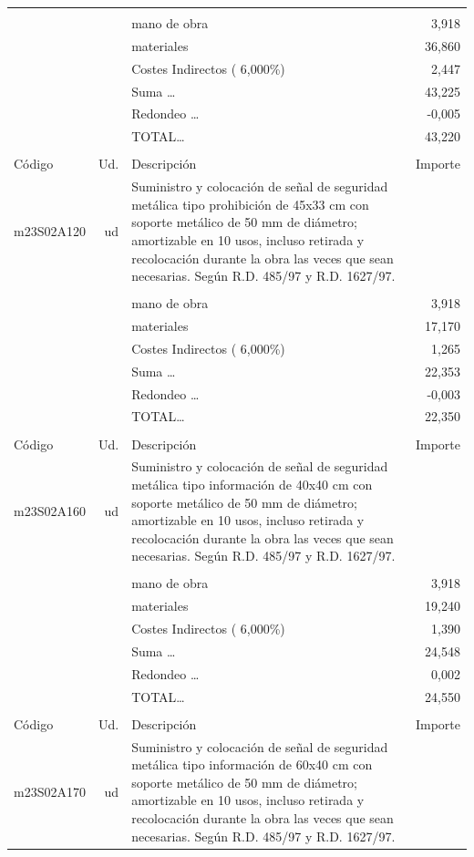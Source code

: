 \begin{supertabular}{l r p{60mm} r}
&&&\\%
&&mano de obra&     3,918\\%
&&materiales&    36,860\\%
&&Costes Indirectos (     6,000\%)&     2,447\\%
&&Suma \ldots&    43,225\\%
&&Redondeo \ldots&    {-}0,005\\%
%
&&TOTAL\ldots&    43,220\\%
&&&\\%
Código&Ud.&Descripción&Importe\\%
\hline%
m23S02A120&ud&Suministro y colocación de señal de seguridad metálica tipo prohibición de 45x33 cm con soporte metálico de 50 mm de diámetro; amortizable en 10 usos, incluso retirada y recolocación durante la obra las veces que sean necesarias. Según R.D. 485/97 y R.D. 1627/97.&\\%
&&&\\%
&&mano de obra&     3,918\\%
&&materiales&    17,170\\%
&&Costes Indirectos (     6,000\%)&     1,265\\%
&&Suma \ldots&    22,353\\%
&&Redondeo \ldots&    {-}0,003\\%
%
&&TOTAL\ldots&    22,350\\%
&&&\\%
Código&Ud.&Descripción&Importe\\%
\hline%
m23S02A160&ud&Suministro y colocación de señal de seguridad metálica tipo información de 40x40 cm con soporte metálico de 50 mm de diámetro; amortizable en 10 usos, incluso retirada y recolocación durante la obra las veces que sean necesarias. Según R.D. 485/97 y R.D. 1627/97.&\\%
&&&\\%
&&mano de obra&     3,918\\%
&&materiales&    19,240\\%
&&Costes Indirectos (     6,000\%)&     1,390\\%
&&Suma \ldots&    24,548\\%
&&Redondeo \ldots&     0,002\\%
%
&&TOTAL\ldots&    24,550\\%
&&&\\%
Código&Ud.&Descripción&Importe\\%
\hline%
m23S02A170&ud&Suministro y colocación de señal de seguridad metálica tipo información de 60x40 cm con soporte metálico de 50 mm de diámetro; amortizable en 10 usos, incluso retirada y recolocación durante la obra las veces que sean necesarias. Según R.D. 485/97 y R.D. 1627/97.&\\%

\end{supertabular}
